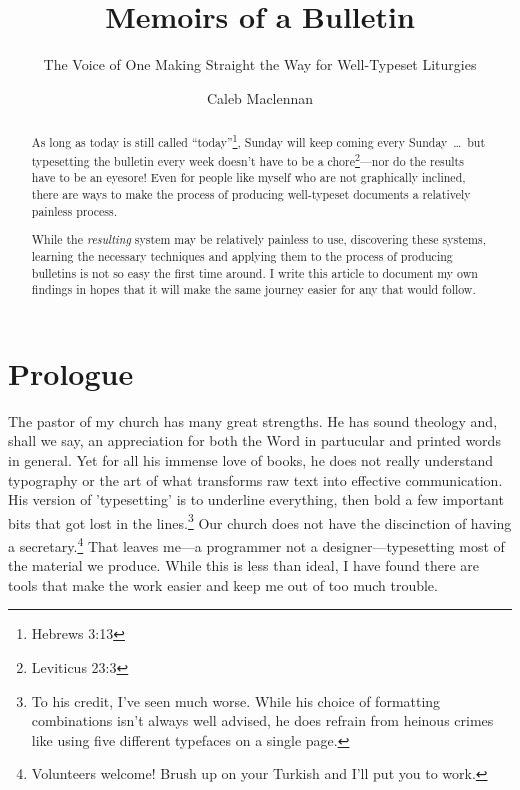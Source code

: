 \documentclass[12pt]{scrartcl}
\title{Memoirs of a Bulletin}
\subtitle{The Voice of One Making Straight the Way for Well-Typeset Liturgies}
\author{Caleb Maclennan}
\makeatletter
\let\svmaketitle\maketitle
\def\maketitle{\protected@edef\saved@title{\@title}%
	\svmaketitle%
	\let\@title\saved@title}%
\makeatother
\begin{document}

\maketitle

\vfill

\begin{abstract}

As long as today is still called ``today''\footnote{Hebrews 3:13}, Sunday will
keep coming every Sunday~\dots~but typesetting the bulletin every week doesn't
have to be a chore\footnote{Leviticus 23:3}---nor do the results have to be an
eyesore! Even for people like myself who are not graphically inclined, there are
ways to make the process of producing well-typeset documents a relatively
painless process.

While the \emph{resulting} system may be relatively painless to use, discovering
these systems, learning the necessary techniques and applying them to the
process of producing bulletins is not so easy the first time around. I write
this article to document my own findings in hopes that it will make the same
journey easier for any that would follow.

\end{abstract}

\section*{Prologue}

The pastor of my church has many great strengths. He has sound theology and,
shall we say, an appreciation for both the Word in partucular and printed words
in general. Yet for all his immense love of books, he does not really understand
typography or the art of what transforms raw text into effective communication.
His version of 'typesetting' is to underline everything, then bold a few
important bits that got lost in the lines.\footnote{To his credit, I've seen
	much worse. While his choice of formatting combinations isn't always
	well advised, he does refrain from heinous crimes like using five
	different typefaces on a single page.} Our church does not have the
discinction of having a secretary.\footnote{Volunteers welcome! Brush up on your
	Turkish and I'll put you to work.} That leaves me---a programmer not a
designer---typesetting most of the material we produce. While this is less than
ideal, I have found there are tools that make the work easier and keep me out of
too much trouble.
\end{document}
